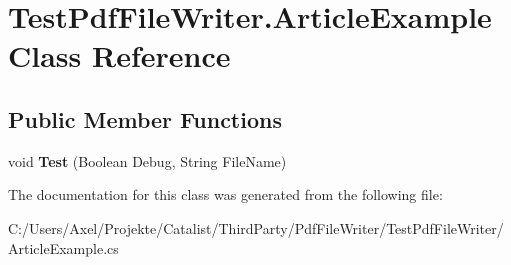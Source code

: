 \hypertarget{class_test_pdf_file_writer_1_1_article_example}{}\section{Test\+Pdf\+File\+Writer.\+Article\+Example Class Reference}
\label{class_test_pdf_file_writer_1_1_article_example}
\subsection*{Public Member Functions}
\begin{DoxyCompactItemize}
\item 
void {\bfseries Test} (Boolean Debug, String File\+Name)\hypertarget{class_test_pdf_file_writer_1_1_article_example_a7c68ce82c987bcf0cabbf9d1ec5873ba}{}\label{class_test_pdf_file_writer_1_1_article_example_a7c68ce82c987bcf0cabbf9d1ec5873ba}

\end{DoxyCompactItemize}


The documentation for this class was generated from the following file\+:\begin{DoxyCompactItemize}
\item 
C\+:/\+Users/\+Axel/\+Projekte/\+Catalist/\+Third\+Party/\+Pdf\+File\+Writer/\+Test\+Pdf\+File\+Writer/Article\+Example.\+cs\end{DoxyCompactItemize}

